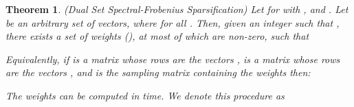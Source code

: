 \documentclass[11pt]{article}
\newcommand{\FNormS}[1]{\mbox{}\|#1\|_\mathrm{F}^2}
\newtheorem{theorem}{Theorem}
\newcommand{\trace}{\text{\rm Tr}}
\newcommand{\mat}[1]{{\ensuremath{\bm{\mathrm{#1}}}}}
\def\ve{{\mathbf v}}
\def\matA{\mat{A}}
\def\matS{\mat{S}}
\def\matV{\mat{V}}
\def\frac#1#2{{#1\over #2}}
\def\eqan#1{}
\def\a{{\mathbf a}}
\begin{document}
\begin{theorem}(Dual Set Spectral-Frobenius Sparsification)
\label{thm:dualset}
Let  for  with , and
. Let  be an arbitrary set
of vectors, where  for all . Then,
given an integer  such that , 
there exists a set of weights  (), 
at most  of which are non-zero, such that
\eqan{
\lambda_{k}\left(\sum_{i=1}^n s_i \ve_i \ve_i^T\right)
&\ge&
\left(1 - \sqrt{\frac{k}{r}}\right)^2,
\qquad \\
\trace\left(\sum_{i=1}^n s_i \a_i\a_i^T\right)
&\le&
\trace\left(\sum_{i=1}^n \a_i \a_i^T\right)
=
\sum_{i=1}^n \| \a_i\|_2^2.
}
Equivalently,
if  is a matrix whose rows are the vectors ,
 is a matrix whose rows are the vectors , and
 is the sampling matrix containing the weights  then:
\eqan{
\sigma_{k}\left(\matV^T \matS\right)
\ge
(1 - \sqrt{{k}/{r}})^2,
\qquad
\FNormS{\matA^T \matS}
\le \FNormS{\matA^T}.
}
The weights  can be computed in  time. We denote this procedure as

\end{theorem} 
\end{document}
